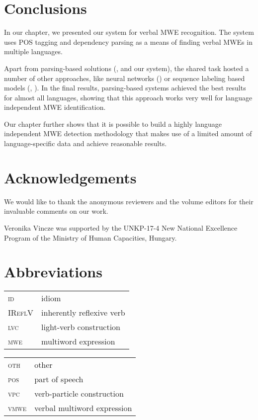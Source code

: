 \documentclass[output=paper,modfonts]{langscibook}
\begin{document}
\section{Conclusions}

In our chapter, we presented our system for verbal MWE recognition. The system uses POS tagging and dependency parsing as a means of finding verbal MWEs in multiple languages.

Apart from parsing-based solutions (\cite{W17-1717}, \cite{W17-1706} and our system), the shared task hosted a number of other approaches, like neural networks (\cite{W17-1707}) or sequence labeling based models (\cite{borocs2017}, \cite{maldonado2017}). In the final results, parsing-based systems achieved the best results for almost all languages, showing that this approach works very well for language independent MWE identification.

Our chapter further shows that it is possible to build a highly language independent MWE detection methodology that makes use of a limited amount of language-specific data and achieve reasonable results. 

\section*{Acknowledgements}

We would like to thank the anonymous reviewers and the volume editors for their invaluable comments on our work.

Veronika Vincze was supported by the UNKP-17-4 New National Excellence Program of the Ministry of Human Capacities, Hungary.

\section*{Abbreviations}
\begin{tabularx}{.48\textwidth}{ll}
\textsc{id} & idiom\\
\textsc{IReflV} & inherently reflexive verb \\
\textsc{lvc} & light-verb construction \\
\textsc{mwe} & multiword expression \\
\end{tabularx}
\begin{tabularx}{.48\textwidth}{ll}
\textsc{oth} & other  \\
\textsc{pos} & part of speech  \\
\textsc{vpc} & verb-particle construction \\
\textsc{vmwe} & verbal multiword expression \\
\end{tabularx}



{\sloppy
\printbibliography[heading=subbibliography,notkeyword=this]
}
\end{document}

